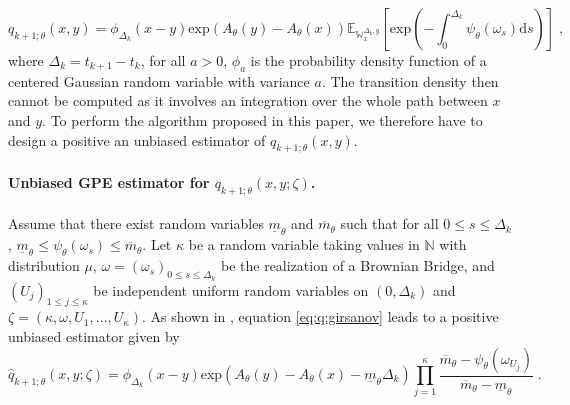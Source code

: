 \documentclass{article}
\newcommand{\gpeUB}{\overline{m}_{\parvec}}
\newcommand{\gpeLB}{\underline{m}_{\parvec}}
\newcommand{\parvec}{\theta}
\newcommand{\hd}[1]{q_{#1}}
\newcommand{\hdhat}[1]{\widehat{q}_{#1}}
\newcommand{\rmd}{\ensuremath{\mathrm{d}}}
\newcommand{\eqsp}{\;}
\begin{document}
\begin{equation}
\label{eq:q:girsanov}
\hd{k+1;\parvec}(x,y) = \phi_{\Delta_k}(x-y)\mathrm{exp}\left(A_{\parvec}(y) - A_{\parvec}(x)\right)\mathbb{E}_{\mathbb{W}_x^{\Delta_k,y}}\left[\mathrm{exp}\left(-\int_0^{\Delta_k} \psi_{\parvec}(\omega_s)\rmd s\right)\right]\eqsp,
\end{equation}
where $\Delta_k = t_{k+1}-t_k$, for all $a>0$, $\phi_a$ is the probability density function of a centered Gaussian random variable with variance $a$. The transition density then cannot be computed as it involves an integration over the whole path between $x$ and $y$. 
To perform the algorithm proposed in this paper, we therefore have to design a positive an unbiased estimator of $\hd{k+1;\parvec}(x,y)$. 

\paragraph{Unbiased GPE estimator for $\hd{k+1;\parvec}(x,y;\zeta)$.}

Assume that there exist random variables $\gpeLB$ and $\gpeUB$ such that for all $0\leqslant s \leqslant \Delta_k$, $\gpeLB \leqslant \psi_{\parvec}(\omega_s) \leqslant \gpeUB$. Let $\kappa$ be a random variable taking values in $\mathbb{N}$ with distribution $\mu$, $\omega = (\omega_s)_{0 \leq s \leq \Delta_k}$ be the realization of a Brownian Bridge, and $(U_j)_{1\leqslant j \leqslant \kappa}$ be independent uniform random
variables on $(0,\Delta_k)$ and $\zeta = (\kappa,\omega, U_1, \ldots , U_{\kappa})$. As
shown in \cite{fearnhead:papaspiliopoulos:roberts:2008}, equation \eqref{eq:q:girsanov} leads to a positive unbiased estimator given by
\[
\hdhat{k+1;\parvec}(x,y;\zeta) = \phi_{\Delta_k}(x-y)\mathrm{exp}\left(A_{\parvec}(y) - A_{\parvec}(x) - \gpeLB\Delta_k\right)\prod_{j=1}^{\kappa}\frac{\gpeUB-\psi_{\parvec}(\omega_{{U_j}})}{\gpeUB-\gpeLB}\eqsp.
\]
\end{document}
